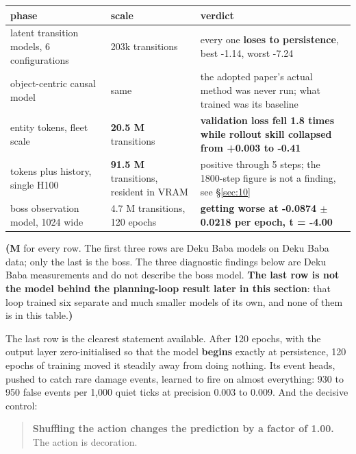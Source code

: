 \documentclass[11pt]{article}
\begin{document}
\begin{table}[!htbp]
  \centering
  \label{tab:theworldmodelbyphaseandwhate}
\begin{center}\small
\begin{tabularx}{\linewidth}{@{}XXX@{}}
\toprule
\textbf{phase} & \textbf{scale} & \textbf{verdict} \\
\midrule
latent transition models, 6 configurations & 203k transitions & every one \textbf{loses to persistence}, best -1.14, worst -7.24 \\
object-centric causal model & same & the adopted paper's actual method was never run; what trained was its baseline \\
entity tokens, fleet scale & \textbf{20.5 M} transitions & \textbf{validation loss fell 1.8 times while rollout skill collapsed from +0.003 to -0.41} \\
tokens plus history, single H100 & \textbf{91.5 M} transitions, resident in VRAM & positive through 5 steps; the 1800-step figure is not a finding, see \S\ref{sec:10} \\
boss observation model, 1024 wide & 4.7 M transitions, 120 epochs & \textbf{getting worse at -0.0874 $\pm$ 0.0218 per epoch, t = -4.00} \\
\bottomrule
\end{tabularx}
\end{center}
\end{table}

\textbf{(M} for every row. The first three rows are Deku Baba models on Deku Baba data; only the last is the boss. The three diagnostic findings below are Deku Baba measurements and do not describe the boss model. \textbf{The last row is not the model behind the planning-loop result later in this section}: that loop trained six separate and much smaller models of its own, and none of them is in this table.\textbf{)}

The last row is the clearest statement available. After 120 epochs, with the output layer zero-initialised so that the model \textbf{begins} exactly at persistence, 120 epochs of training moved it steadily away from doing nothing. Its event heads, pushed to catch rare damage events, learned to fire on almost everything: 930 to 950 false events per 1,000 quiet ticks at precision 0.003 to 0.009. And the decisive control:

\begin{quote}
\textbf{Shuffling the action changes the prediction by a factor of 1.00.} The action is decoration.
\end{quote}
\end{document}
